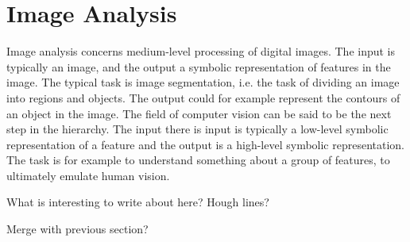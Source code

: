 \section{Image Analysis}
Image analysis concerns medium-level processing of digital images. The input is typically an image, and the output a symbolic representation of features in the image. The typical task is image segmentation, i.e. the task of dividing an image into regions and objects. The output could for example represent the contours of an object in the image. \cite[p. 1-2]{pitas}\cite[p. 1-2]{gonzalez-woods}
The field of computer vision can be said to be the next step in the hierarchy. 
The input there is input is typically a low-level symbolic representation of a feature and the output is a high-level symbolic representation. 
The task is for example to understand something about a group of features, to ultimately emulate human vision. \cite[p. 1-3]{pitas}\cite[p. 1-3]{gonzalez-woods}

What is interesting to write about here? Hough lines?

Merge with previous section?





















